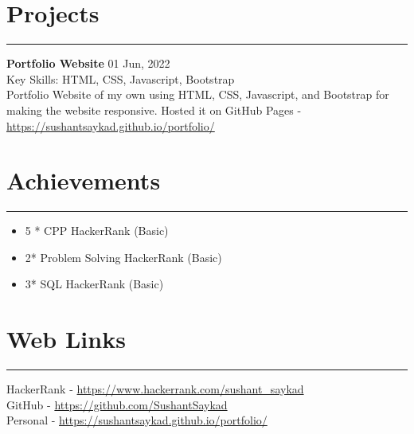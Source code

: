 \documentclass[a4paper,11pt]{article}
\begin{document}
\section*{Projects}
\vspace{-0.2cm}
\hrule
\vspace{0.2cm}
\textbf{Portfolio Website} \hfill 01 Jun, 2022\\
Key Skills: HTML, CSS, Javascript, Bootstrap\\
Portfolio Website of my own using HTML, CSS, Javascript, and Bootstrap for making the website responsive. Hosted it on GitHub Pages - \href{https://sushantsaykad.github.io/portfolio/}{https://sushantsaykad.github.io/portfolio/}

\section*{Achievements}
\vspace{-0.2cm}
\hrule
\vspace{0.2cm}
\begin{itemize}
    \item 5 * CPP HackerRank (Basic)
    \item 2* Problem Solving HackerRank (Basic)
    \item 3* SQL HackerRank (Basic)
\end{itemize}

\section*{Web Links}
\vspace{-0.2cm}
\hrule
\vspace{0.2cm}
HackerRank - \href{https://www.hackerrank.com/sushant_saykad}{https://www.hackerrank.com/sushant_saykad}\\
GitHub - \href{https://github.com/SushantSaykad}{https://github.com/SushantSaykad}\\
Personal - \href{https://sushantsaykad.github.io/portfolio/}{https://sushantsaykad.github.io/portfolio/}
\end{document}
